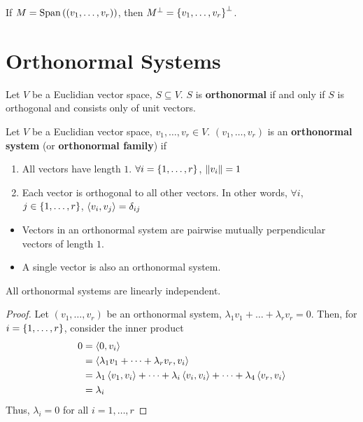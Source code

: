 \documentclass[letterpaper,12pt]{article}
\begin{document}
\begin{corollary}
If $M = \text{Span}\left((v_1, \dots, v_r) \right)$, then $M^{\perp} = \left\{ v_1, \dots, v_r \right\}^{\perp}$.
\end{corollary}

\section*{Orthonormal Systems}
\begin{definition}
Let $V$ be a Euclidian vector space, $S \subseteq V$. $S$ is \textbf{orthonormal} if and only if $S$ is orthogonal and consists only of unit vectors.
\end{definition}

\begin{definition}
Let $V$ be a Euclidian vector space, $v_1, \dots, v_r \in V$. $(v_1, \dots, v_r)$ is an \textbf{orthonormal system} (or \textbf{orthonormal family}) if
\begin{enumerate}
    \item All vectors have length $1$. $\forall i = \left\{ 1, \dots, r \right\}$, $\left\lVert v_i \right\rVert = 1$
    \item Each vector is orthogonal to all other vectors. In other words, $\forall i$, $j \in \left\{ 1, \dots, r \right\}$, $\left< v_i, v_j \right> = \delta_{ij}$
\end{enumerate}
\begin{itemize}
    \item Vectors in an orthonormal system are pairwise mutually perpendicular vectors of length $1$.
    \item A single vector is also an orthonormal system.
\end{itemize}
\end{definition}

\begin{lemma}
All orthonormal systems are linearly independent.
\end{lemma}
\begin{proof}
Let $(v_1, \dots, v_r)$ be an orthonormal system, $\lambda_1 v_1 + \dots + \lambda_r v_r = 0$. Then, for $i = \left\{ 1, \dots, r \right\}$, consider the inner product
\begin{align*}
    0 & = \left< 0, v_i \right> \\
    & = \left< \lambda_1 v_1 + \dots + \lambda_r v_r, v_i \right> \\
    & = \lambda_1 \left< v_1, v_i \right> + \dots + \lambda_i \left< v_i, v_i \right> + \dots + \lambda_4 \left< v_r, v_i \right> \\
    & = \lambda_i
\end{align*}
Thus, $\lambda_i = 0$ for all $i = 1, \dots, r$
\end{proof}
\end{document}
